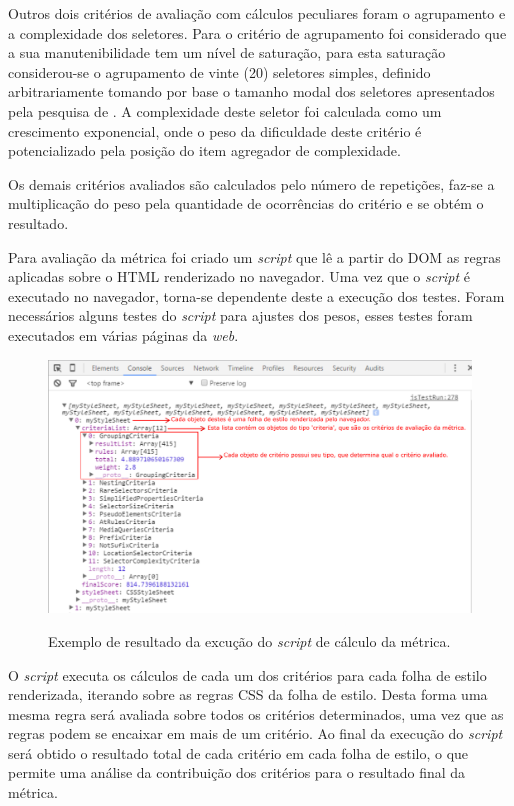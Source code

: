 Outros dois critérios de avaliação com cálculos peculiares foram o agrupamento e a complexidade dos seletores. Para o critério de agrupamento foi considerado que a sua manutenibilidade tem um nível de saturação, para esta saturação considerou-se o agrupamento de vinte (20) seletores simples, definido arbitrariamente tomando por base o tamanho modal dos seletores apresentados pela pesquisa de . A complexidade deste seletor foi calculada como um crescimento exponencial, onde o peso da dificuldade deste critério é potencializado pela posição do item agregador de complexidade.

Os demais critérios avaliados são calculados pelo número de repetições, faz-se a multiplicação do peso pela quantidade de ocorrências do critério e se obtém o resultado.

Para avaliação da métrica foi criado um \textit{script} que lê a partir do DOM as regras aplicadas sobre o HTML renderizado no navegador. Uma vez que o \textit{script} é executado no navegador, torna-se dependente deste a execução dos testes. Foram necessários alguns testes do \textit{script} para ajustes dos pesos, esses testes foram executados em várias páginas da \textit{web}.

\begin{figure}[!htb]
	\centering
	\caption{Exemplo de resultado da excução do \textit{script} de cálculo da métrica.}
	\includegraphics[width=1\textwidth]{./04-figuras/calculator}
	\label{fig:calculatorTest}
\end{figure}

O \textit{script} executa os cálculos de cada um dos critérios para cada folha de estilo renderizada, iterando sobre as regras CSS da folha de estilo. Desta forma uma mesma regra será avaliada sobre todos os critérios determinados, uma vez que as regras podem se encaixar em mais de um critério. Ao final da execução do \textit{script} será obtido o resultado total de cada critério em cada folha de estilo, o que permite uma análise da contribuição dos critérios para o resultado final da métrica.

